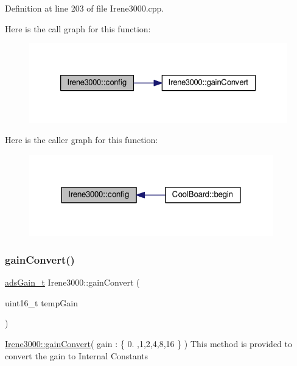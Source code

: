 Definition at line 203 of file Irene3000.\+cpp.

Here is the call graph for this function\+:\nopagebreak
\begin{figure}[H]
\begin{center}
\leavevmode
\includegraphics[width=326pt]{class_irene3000_afed5c35e4b23963c157847ef27c11e9c_cgraph}
\end{center}
\end{figure}
Here is the caller graph for this function\+:\nopagebreak
\begin{figure}[H]
\begin{center}
\leavevmode
\includegraphics[width=300pt]{class_irene3000_afed5c35e4b23963c157847ef27c11e9c_icgraph}
\end{center}
\end{figure}
\mbox{\label{class_irene3000_abcad62d1201a59f8dd3ba87048002728}} 
\subsubsection{\texorpdfstring{gain\+Convert()}{gainConvert()}}
{\footnotesize\ttfamily \hyperlink{_cool_adafruit___a_d_s1015_8h_a3d6c0e15829a207b9155890811fa4781}{ads\+Gain\+\_\+t} Irene3000\+::gain\+Convert (\begin{DoxyParamCaption}\item[{uint16\+\_\+t}]{temp\+Gain }\end{DoxyParamCaption})}

\hyperlink{class_irene3000_abcad62d1201a59f8dd3ba87048002728}{Irene3000\+::gain\+Convert}( gain \+: \{ 0. ,1,2,4,8,16 \} ) This method is provided to convert the gain to Internal Constants

